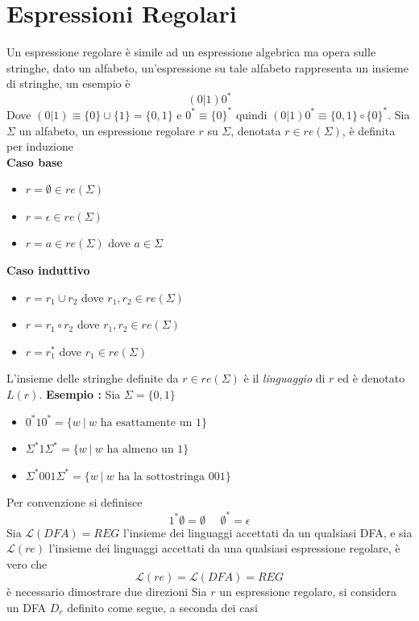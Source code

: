 \documentclass[10pt, letterpaper]{report}
\begin{document}
\section{Espressioni Regolari}
 Un espressione regolare è simile ad un espressione algebrica ma opera sulle stringhe, dato un alfabeto, un'espressione 
 su tale alfabeto rappresenta un insieme di stringhe, un esempio è 
 $$(0|1)0^*$$ 
 Dove $(0|1)\equiv \{0\}\cup \{1\}=\{0,1\}$ e $0^*\equiv\{0\}^*$ quindi $(0|1)0^*\equiv \{0,1\}\circ \{0\}^*$.\acc 
   Sia $\Sigma$ un alfabeto, un espressione regolare $r$ su $\Sigma$, denotata 
 $r\in re(\Sigma)$, è definita per induzione \\ 
 \textbf{Caso base}\begin{itemize}
    \item $r=\emptyset\in re(\Sigma)$
    \item $r=\epsilon\in re(\Sigma)$
    \item $r=a\in re(\Sigma)$ dove $a\in\Sigma$
 \end{itemize}
 \textbf{Caso induttivo}\begin{itemize}
    \item $r=r_1\cup r_2$ dove $r_1,r_2\in re(\Sigma)$
    \item $r=r_1\circ r_2$ dove $r_1,r_2\in re(\Sigma)$
    \item $r=r_1^*$ dove $r_1\in re(\Sigma)$
 \end{itemize}
L'insieme delle stringhe definite da  $r\in re(\Sigma)$ è il \textit{linguaggio} di $r$ ed è denotato $L(r)$.\acc 
\textbf{Esempio : } Sia $\Sigma = \{0,1\}$\begin{itemize}
    \item $0^*10^*=\{w\ | \ w \text{ ha esattamente un }1\}$
    \item $\Sigma^*1\Sigma^*=\{w\ | \ w \text{ ha almeno un }1\}$
    \item $\Sigma^*001\Sigma^*=\{w\ | \ w \text{ ha la sottostringa }001\}$
\end{itemize}
Per convenzione si definisce $$1^*\emptyset = \emptyset \ \ \ \ \ \ \emptyset^*=\epsilon $$
 Sia $\mathcal{L}(DFA)=REG$ l'insieme dei linguaggi accettati da un qualsiasi DFA, e sia 
$\mathcal{L}(re)$   l'insieme dei linguaggi accettati da una qualsiasi espressione regolare, è vero che 
$$\mathcal{L}(re)=\mathcal{L}(DFA)=REG $$
\dimo{} è necessario dimostrare due direzioni\acc
{} Sia $r$ un espressione regolare, si considera un DFA 
$D_r$ definito come segue, a seconda dei casi\acc 
\end{document}
